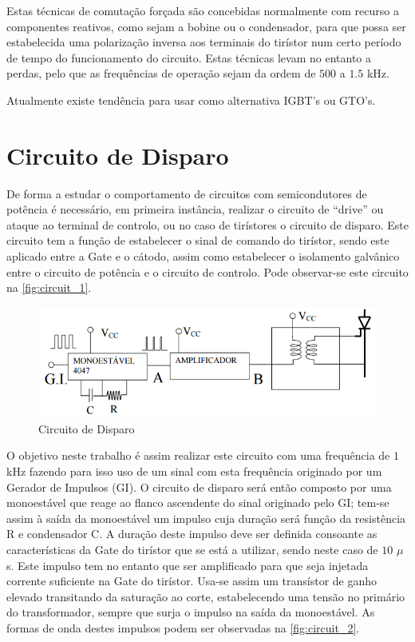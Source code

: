 \documentclass[a4paper,11pt]{article}
\begin{document}
	Estas técnicas de comutação forçada são concebidas normalmente com recurso a componentes reativos, como sejam a bobine ou o condensador, para que possa ser estabelecida uma polarização inversa aos terminais do tirístor num certo período de tempo do funcionamento do circuito. Estas técnicas levam no entanto a perdas, pelo que as frequências de operação sejam da ordem de $500$ a $1.5$ kHz.
	
	Atualmente existe tendência para usar como alternativa IGBT’s ou GTO’s.
	
	\section{Circuito de Disparo}
	
	De forma a estudar o comportamento de circuitos com semicondutores de potência é necessário, em primeira instância, realizar o circuito de “drive” ou ataque ao terminal de controlo, ou no caso de tirístores o circuito de disparo. Este circuito tem a função de estabelecer o sinal de comando do tirístor, sendo este aplicado entre a Gate e o cátodo, assim como estabelecer o isolamento galvânico entre o circuito de potência e o circuito de controlo. Pode observar-se este circuito na \autoref{fig:circuit_1}.
	
	\begin{figure}[h]
		\centering
		\includegraphics[width=\linewidth]{img/trigger_circuit}
		\caption{Circuito de Disparo}
		\label{fig:circuit_1}
	\end{figure}
	
	O objetivo neste trabalho é assim realizar este circuito com uma frequência de $1$ kHz fazendo para isso uso de um sinal com esta frequência originado por um Gerador de Impulsos (GI). O circuito de disparo será então composto por uma monoestável que reage ao flanco ascendente do sinal originado pelo GI; tem-se assim à saída da monoestável um impulso cuja duração será função da resistência R e condensador C. A duração deste impulso deve ser definida consoante as características da Gate do tirístor que se está a utilizar, sendo neste caso de $10$ $\mu$s. Este impulso tem no entanto que ser amplificado para que seja injetada corrente suficiente na Gate do tirístor. Usa-se assim um transístor de ganho elevado transitando da saturação ao corte, estabelecendo uma tensão no primário do transformador, sempre que surja o impulso na saída da monoestável. As formas de onda destes impulsos podem ser observadas na \autoref{fig:circuit_2}.
	
\end{document}
